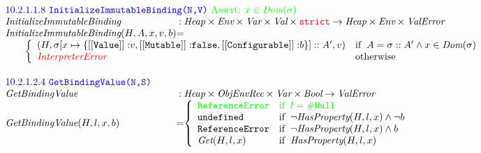 \[
\begin{array}{l@{}c@{}l}

\multicolumn{3}{l}{\mbox{\inblue 10.2.1.1.8 {\tt InitializeImmutableBinding(N,V)}
{\ingreen Assert: $x\in\hf{Dom}(\er)$}}}\\
\hf{InitializeImmutableBinding} & :& \Heap \times \Env \times \Var \times \Val \times \strict \rightarrow \Heap \times \Env \times \ve \\
\hf{InitializeImmutableBinding}(H,A,x,v,b) & =\\
\multicolumn{3}{l}{
\rulesep
\left\{\begin{array}{ll}

(H, \mkst{\er[x\mapsto\{{\tt [[Value]]:}v, {\tt [[Mutable]]:}\false, {\tt [[Configurable]]:} b\}]}A', v)
&\ifc{A = \mkst{\er}A'\wedge x\in\hf{Dom}(\er)
}\\
{\inred \hf{InterpreterError}}
&\mbox{otherwise}\\
\end{array}\right.
}
\\[2em]


\multicolumn{3}{l}{\mbox{\inblue 10.2.1.2.4 {\tt GetBindingValue(N,S)}}}\\
\hf{GetBindingValue} & :& \Heap \times \emph{ObjEnvRec} \times \Var \times \Bool \rightarrow \ValError\\
\hf{GetBindingValue}(H,l,x,b) & =&
\left\{\begin{array}{ll}
\ingreen\re &\ingreen \ifc{l = \nullL}\\
\undef &\ifc{\neg\hf{HasProperty}(H,l,x) \wedge \neg b}\\
\re &\ifc{\neg\hf{HasProperty}(H,l,x) \wedge b}\\
\hf{Get}(H,l,x)&\ifc{\hf{HasProperty}(H,l,x)}\\
\end{array}\right.
\\[2em]


\end{array}\]
